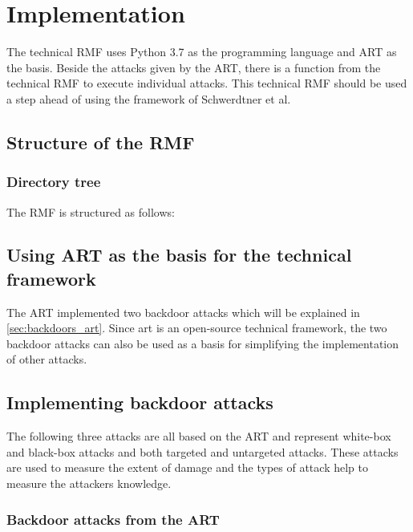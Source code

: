 \section{Implementation}
\label{sec:implementation}

The technical RMF uses Python 3.7 as the programming language and ART as the basis. Beside the attacks given by the ART, there is a function from the technical RMF to execute individual attacks. This technical RMF should be used a step ahead of using the framework of Schwerdtner et al.

\subsection{Structure of the RMF}

\subsubsection*{Directory tree}

The RMF is structured as follows:


\subsection{Using ART as the basis for the technical framework}

The ART implemented two backdoor attacks which will be explained in \ref{sec:backdoors_art}. Since art is an open-source technical framework, the two backdoor attacks can also be used as a basis for simplifying the implementation of other attacks.

\subsection{Implementing backdoor attacks}

The following three attacks are all based on the ART and represent white-box and black-box attacks and both targeted and untargeted attacks. These attacks are used to measure the extent of damage and the types of attack help to measure the attackers knowledge.

\subsubsection*{Backdoor attacks from the ART}
\label{sec:backdoors_art}

